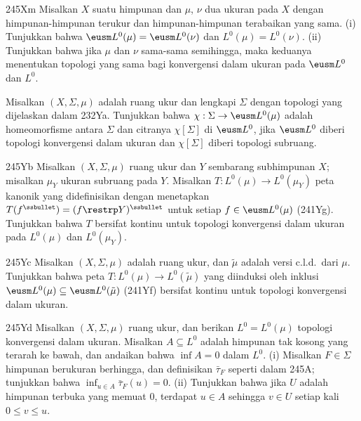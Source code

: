 {\spheader 245Xm Misalkan $X$ suatu himpunan dan $\mu$, $\nu$ dua ukuran pada
$X$ dengan himpunan-himpunan terukur dan himpunan-himpunan terabaikan yang
sama. (i) Tunjukkan bahwa $\eusm L^0(\mu)=\eusm L^0(\nu)$ dan
$L^0(\mu)=L^0(\nu)$. (ii) Tunjukkan bahwa jika $\mu$ dan $\nu$ sama-sama
semihingga, maka keduanya menentukan topologi yang sama bagi
konvergensi dalam ukuran pada $\eusm L^0$ dan $L^0$. 

Misalkan $(X,\Sigma,\mu)$ adalah ruang ukur dan lengkapi $\Sigma$ dengan topologi
yang dijelaskan dalam 232Ya. Tunjukkan bahwa $\chi:\Sigma\to\eusm L^0(\mu)$ adalah
homeomorfisme antara $\Sigma$ dan citranya $\chi[\Sigma]$ di $\eusm L^0$, jika
$\eusm L^0$ diberi topologi konvergensi dalam ukuran dan $\chi[\Sigma]$
diberi topologi subruang.

\spheader 245Yb Misalkan $(X,\Sigma,\mu)$ ruang ukur dan $Y$ sembarang
subhimpunan $X$; misalkan $\mu_Y$ ukuran subruang pada $Y$. Misalkan
$T:L^0(\mu)\to L^0(\mu_Y)$ peta kanonik yang
didefinisikan dengan menetapkan $T(f^{\ssbullet})=(f\restrp Y)^{\ssbullet}$
untuk setiap $f\in\eusm L^0(\mu)$ (241Yg). Tunjukkan bahwa $T$ bersifat
kontinu untuk topologi konvergensi dalam ukuran pada $L^0(\mu)$ dan
$L^0(\mu_Y)$.

\spheader 245Yc Misalkan $(X,\Sigma,\mu)$ adalah ruang ukur, dan $\tilde\mu$
adalah versi c.l.d.\  dari $\mu$. Tunjukkan bahwa peta $T:L^0(\mu)\to
L^0(\tilde\mu)$ yang diinduksi oleh inklusi $\eusm L^0(\mu)\subseteq\eusm
L^0(\tilde\mu)$ (241Yf) bersifat kontinu untuk topologi konvergensi dalam ukuran.

\spheader 245Yd Misalkan $(X,\Sigma,\mu)$ ruang ukur, dan berikan
$L^0=L^0(\mu)$ topologi konvergensi dalam ukuran.  Misalkan $A\subseteq L^0$
adalah himpunan tak kosong yang terarah ke bawah, dan andaikan bahwa
$\inf A=0$ dalam $L^0$. (i) Misalkan $F\in\Sigma$ himpunan berukuran
berhingga, dan definisikan $\bar\tau_F$ seperti dalam 245A; tunjukkan bahwa
$\inf_{u\in A}\bar\tau_F(u)=0$.    (ii) Tunjukkan bahwa jika $U$ adalah
himpunan terbuka yang memuat $0$, terdapat $u\in A$ sehingga $v\in U$ setiap
kali $0\le v\le u$.

}
